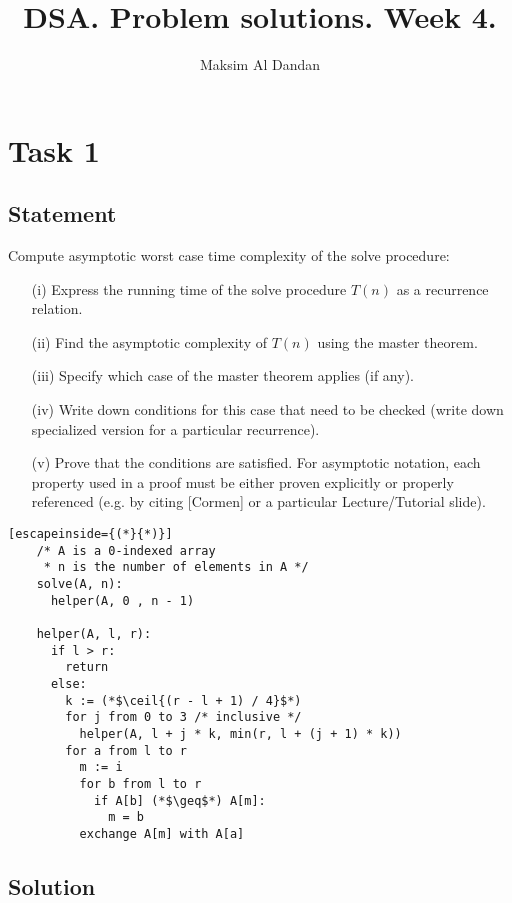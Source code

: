 \documentclass{article}
\title{DSA. Problem solutions. Week 4.}
\author{Maksim Al Dandan}
\DeclarePairedDelimiter\ceil{\lceil}{\rceil}
\begin{document}
\maketitle


\section{Task 1}
\subsection{Statement}
Compute asymptotic worst case time complexity of the solve procedure:

\begin{enumerate}
    \setlength\itemsep{0em}
    \item[(i)] Express the running time of the solve procedure $T(n)$ as a recurrence relation.
    \item[(ii)] Find the asymptotic complexity of $T(n)$ using the master theorem. 
    \item[(iii)] Specify which case of the master theorem applies (if any).
    \item[(iv)] Write down conditions for this case that need to be checked (write down specialized version for a particular recurrence).
    \item[(v)] Prove that the conditions are satisfied. For asymptotic notation, each property used in a proof must be either proven explicitly or properly referenced (e.g. by citing [Cormen] or a particular Lecture/Tutorial slide).
\end{enumerate}

\begin{lstlisting}[escapeinside={(*}{*)}]
    /* A is a 0-indexed array
     * n is the number of elements in A */
    solve(A, n):
      helper(A, 0 , n - 1)
 
    helper(A, l, r):
      if l > r:
        return 
      else:
        k := (*$\ceil{(r - l + 1) / 4}$*) 
        for j from 0 to 3 /* inclusive */
          helper(A, l + j * k, min(r, l + (j + 1) * k))
        for a from l to r
          m := i
          for b from l to r
            if A[b] (*$\geq$*) A[m]:
              m = b
          exchange A[m] with A[a]
\end{lstlisting}

\subsection{Solution}
\end{document}

